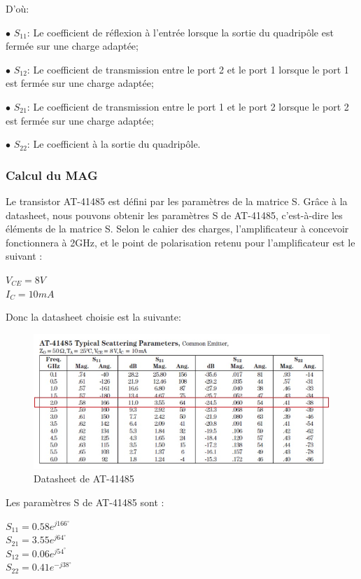 \documentclass[french]{article}
\begin{document}
D’où:

$\bullet$ $S_{11}$: Le coefficient de réflexion à l’entrée lorsque la sortie du quadripôle est fermée sur une charge adaptée;

$\bullet$ $S_{12}$: Le coefficient de transmission entre le port 2 et le port 1 lorsque le port 1 est fermée sur une charge adaptée;

$\bullet$ $S_{21}$: Le coefficient de transmission entre le port 1 et le port 2 lorsque le port 2 est fermée sur une charge adaptée;

$\bullet$ $S_{22}$: Le coefficient à la sortie du quadripôle.

\subsubsection{Calcul du MAG}

Le transistor AT-41485 est défini par les paramètres de la matrice S. Grâce à la datasheet, nous pouvons obtenir les paramètres S de AT-41485, c'est-à-dire les éléments de la matrice S. Selon le cahier des charges, l'amplificateur à concevoir fonctionnera à 2GHz, et le point de polarisation retenu pour l’amplificateur est le suivant :

{\centering
	$V_{CE}=8V$\\
	$I_{C}=10mA$\\
}

Donc la datasheet choisie est la suivante: 
\begin{figure}[H]
	\centering
	\includegraphics[width=0.9\linewidth]{../5SynthAmp/Datasheet_AT41485}
	\caption{Datasheet de AT-41485}
	\label{fig:datasheet_AT}
\end{figure}

Les paramètres S de AT-41485 sont :

{\centering
$S_{11}=0.58e^{j166^{\circ}}$\\
$S_{21}=3.55e^{j64^{\circ}}$\\
$S_{12}=0.06e^{j54^{\circ}}$\\
$S_{22}=0.41e^{-j38^{\circ}}$\\
}
\end{document}
